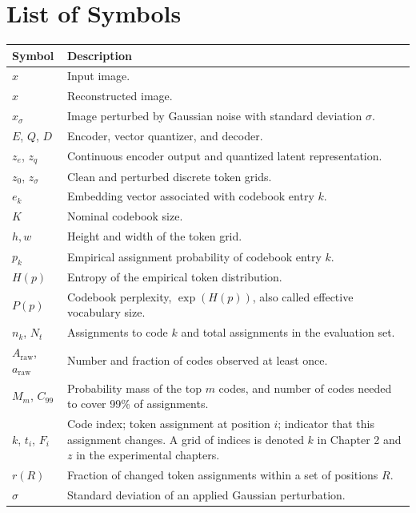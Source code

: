 \documentclass{Configuration_Files/PoliMi3i_thesis}
\begin{document}
\chapter*{List of Symbols}
\begin{longtable}{p{}p{}}
    \textbf{Symbol} & \textbf{Description} \\ \hline
    $x$ & Input image. \\[2pt]
    $\hat{x}$ & Reconstructed image. \\[2pt]
    $x_{\sigma}$ & Image perturbed by Gaussian noise with standard deviation $\sigma$. \\[2pt]
    $E$, $Q$, $D$ & Encoder, vector quantizer, and decoder. \\[2pt]
    $z_e$, $z_q$ & Continuous encoder output and quantized latent representation. \\[2pt]
    $z_0$, $z_{\sigma}$ & Clean and perturbed discrete token grids. \\[2pt]
    $e_k$ & Embedding vector associated with codebook entry $k$. \\[2pt]
    $K$ & Nominal codebook size. \\[2pt]
    $h,w$ & Height and width of the token grid. \\[2pt]
    $p_k$ & Empirical assignment probability of codebook entry $k$. \\[2pt]
    $H(p)$ & Entropy of the empirical token distribution. \\[2pt]
    $P(p)$ & Codebook perplexity, $\exp(H(p))$, also called effective vocabulary size. \\[2pt]
    $n_k$, $N_t$ & Assignments to code $k$ and total assignments in the evaluation set. \\[2pt]
    $A_{\mathrm{raw}}$, $a_{\mathrm{raw}}$ & Number and fraction of codes observed at least once. \\[2pt]
    $M_m$, $C_{99}$ & Probability mass of the top $m$ codes, and number of codes needed to cover 99\% of assignments. \\[2pt]
    $k$, $t_i$, $F_i$ & Code index; token assignment at position $i$; indicator that this assignment changes. A grid of indices is denoted $k$ in Chapter 2 and $z$ in the experimental chapters. \\[2pt]
    $r(R)$ & Fraction of changed token assignments within a set of positions $R$. \\[2pt]
    $\sigma$ & Standard deviation of an applied Gaussian perturbation. \\[2pt]

\end{longtable}
\end{document}
